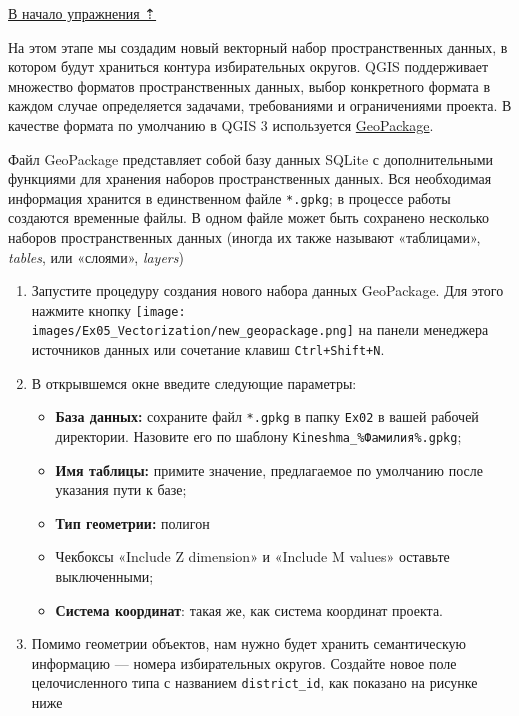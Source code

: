 \documentclass[
  12pt,
]{book}
\providecommand{\tightlist}{%
  \setlength{\itemsep}{0pt}\setlength{\parskip}{0pt}}
\begin{document}
\protect\hyperlink{digitizingf-districts}{В начало упражнения ⇡}

На этом этапе мы создадим новый векторный набор пространственных данных, в котором будут храниться контура избирательных округов. QGIS поддерживает множество форматов пространственных данных, выбор конкретного формата в каждом случае определяется задачами, требованиями и ограничениями проекта. В качестве формата по умолчанию в QGIS 3 используется \href{https://www.geopackage.org/}{GeoPackage}.

Файл GeoPackage представляет собой базу данных SQLite с дополнительными функциями для хранения наборов пространственных данных. Вся необходимая информация хранится в единственном файле \texttt{*.gpkg}; в процессе работы создаются временные файлы. В одном файле может быть сохранено несколько наборов пространственных данных (иногда их также называют «таблицами», \emph{tables}, или «слоями», \emph{layers})

\begin{enumerate}
\def\labelenumi{\arabic{enumi}.}
\item
  Запустите процедуру создания нового набора данных GeoPackage. Для этого нажмите кнопку \texttt{[image: images/Ex05\_Vectorization/new\_geopackage.png]} на панели менеджера источников данных или сочетание клавиш \texttt{Ctrl+Shift+N}.
\item
  В открывшемся окне введите следующие параметры:

  \begin{itemize}
  \tightlist
  \item
    \textbf{База данных:} сохраните файл \texttt{*.gpkg} в папку \texttt{Ex02} в вашей рабочей директории. Назовите его по шаблону \texttt{Kineshma\_\%Фамилия\%.gpkg};
  \item
    \textbf{Имя таблицы:} примите значение, предлагаемое по умолчанию после указания пути к базе;
  \item
    \textbf{Тип геометрии:} полигон
  \item
    Чекбоксы «Include Z dimension» и «Include M values» оставьте выключенными;
  \item
    \textbf{Система координат}: такая же, как система координат проекта.
  \end{itemize}
\item
  Помимо геометрии объектов, нам нужно будет хранить семантическую информацию --- номера избирательных округов. Создайте новое поле целочисленного типа с названием \texttt{district\_id}, как показано на рисунке ниже
\end{enumerate}
\end{document}
